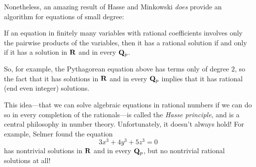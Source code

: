 \documentclass[11pt,oneside]{amsart}
\begin{document}
Nonetheless, an amazing result of Hasse and Minkowski {\em does} provide an algorithm for equations of small degree:

\begin{theorem}
	If an equation in finitely many variables with rational coefficients involves only the pairwise products of
	the variables,
	then it has a rational solution if and only if it has a solution in $\mathbf{R}$ and in every $\mathbf{Q}_p$.
\end{theorem}

So, for example, the Pythagorean equation above has terms only of degree $2$, so the fact that it has solutions in $\mathbf{R}$
and in every $\mathbf{Q}_p$ implies that it has rational (end even integer) solutions.

This idea---that we can solve algebraic equations in rational numbers if we can do so in every completion 
of the rationals---is called the {\em Hasse principle}, and is a central philosophy in number theory.  Unfortunately, it doesn't always hold!
For example, Selmer found the equation
$$
	3x^3 + 4y^3 + 5z^3 = 0
$$
has nontrivial solutions in $\mathbf{R}$ and in every $\mathbf{Q}_p$, but no nontrivial rational solutions at all!




 









\end{document}
